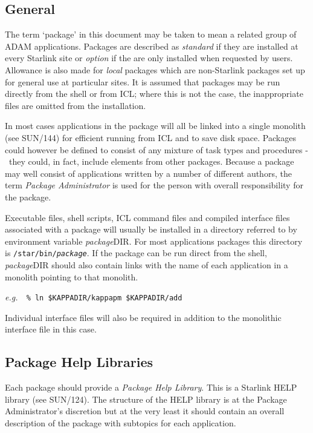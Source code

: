 \documentclass[twoside,11pt]{article}
\newcommand{\xref}[3]{#1}
\newcommand{\xlabel}[1]{}
\renewcommand{\_}{\texttt{\symbol{95}}}
\newcommand{\dash}{--}
\renewcommand{\dash}{-}
\begin{document}
\subsection{\xlabel{general}General}
\label{pack_gen}
The term `package' in this document may be taken to mean a related group of
ADAM applications. Packages are described as \textit{standard} if they are
installed at every Starlink site or \textit{option} if the are only installed
when requested by users.
Allowance is also
made for \textit{local}\/ packages which are non-Starlink packages set up for
general use at particular sites.
It is assumed that packages may be run directly from the shell or from ICL;
where this is not the case, the inappropriate files are omitted from the
installation.

In most cases applications in the package will all be linked into a single
monolith (see
\xref{SUN/144}{sun144}{monoliths}) for efficient running from ICL and to save
disk space.
Packages could however be defined to consist of any mixture of task types
and procedures \dash\ they could, in fact, include elements from other packages.
Because a package may well consist of applications written by a number of
different authors, the term \textit{Package Administrator} is used for the
person with overall responsibility for the package.

Executable files, shell scripts, ICL command files and compiled
\xref{interface files}{sun115}{}
associated with a package will usually be installed in a directory referred to
by environment variable \textit{package}\_DIR.
For most applications packages this directory is
\texttt{/star/bin/\textit{package}}.
If the package can be run direct from the shell, \textit{package}\_DIR should
also contain links with the name of each application in a monolith pointing
to that monolith.

\textit{e.g.}\ \texttt{ \% ln \$KAPPA\_DIR/kappa\_pm \$KAPPA\_DIR/add }

Individual interface files will also be required in addition to the monolithic
interface file in this case.

\subsection{\xlabel{package_help_libraries}Package Help Libraries}
Each package should provide a \textit{Package Help Library}.
This is a Starlink HELP library (see
\xref{SUN/124}{sun124}{}).
The structure of the HELP library is at the Package Administrator's discretion
but at the very least it should contain an overall description of the package
with subtopics for each application.
\end{document}
